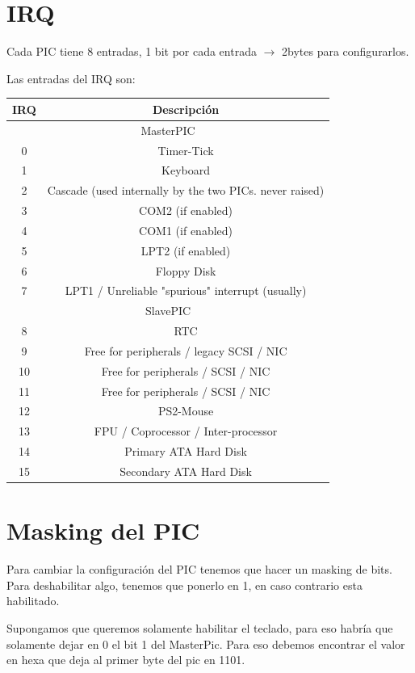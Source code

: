 \documentclass[]{article}
\begin{document}
\section*{IRQ}
Cada PIC tiene 8 entradas, 1 bit por cada entrada $\longrightarrow$ 2bytes para configurarlos.

Las entradas del IRQ son:
\begin{center}
	\begin{tabular}{ |c|c| }
		\hline
		IRQ & Descripción\\
		\hline
		\multicolumn{2}{|c|}{MasterPIC} \\	
		\hline	
		0 & Timer-Tick\\
		1 & Keyboard \\
		2 & Cascade (used internally by the two PICs. never raised) \\
		3 & COM2 (if enabled)  \\
		4 & COM1 (if enabled)  \\
		5 & LPT2 (if enabled)  \\
		6 & Floppy Disk  \\
		7 & LPT1 / Unreliable "spurious" interrupt (usually)  \\
		\hline
		\multicolumn{2}{|c|}{SlavePIC} \\	
		\hline	
		8 & RTC \\
		9 & Free for peripherals / legacy SCSI / NIC  \\
		10 & Free for peripherals / SCSI / NIC  \\
		11 & Free for peripherals / SCSI / NIC  \\
		12 & PS2-Mouse \\
		13 & FPU / Coprocessor / Inter-processor  \\
		14 & Primary ATA Hard Disk  \\
		15 & Secondary ATA Hard Disk  \\
		\hline
	\end{tabular}
\end{center}

\section*{Masking del PIC}
Para cambiar la configuraci\'on del PIC tenemos que hacer un masking de bits.
Para deshabilitar algo, tenemos que ponerlo en 1, en caso contrario esta habilitado.

Supongamos que queremos solamente habilitar el teclado, para eso habría que
solamente dejar en 0 el bit 1 del MasterPic. Para eso debemos encontrar el valor
en hexa que deja al primer byte del pic en 1101.
\end{document}
